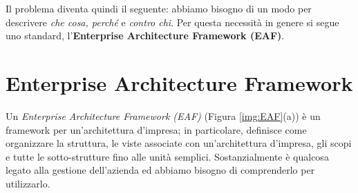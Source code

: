Il problema diventa quindi il seguente: abbiamo bisogno di un modo per descrivere \textit{che cosa, perché} e \textit{contro chi}. Per questa necessità in genere si segue uno standard, l'\textbf{Enterprise Architecture Framework (EAF)}.

\section{Enterprise Architecture Framework}
Un \textit{Enterprise Architecture Framework (EAF)} (Figura \ref{img:EAF}(a)) è un framework per un'architettura d'impresa; in particolare, definisce come organizzare la struttura, le viste associate con un'architettura d'impresa, gli scopi e tutte le sotto-strutture fino alle unità semplici. Sostanzialmente è qualcosa legato alla gestione dell'azienda ed abbiamo bisogno di comprenderlo per utilizzarlo.
